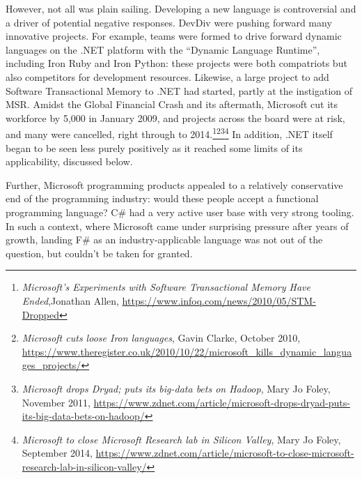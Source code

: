 \documentclass[acmsmall]{acmart}\settopmatter{}
\begin{document}
However, not all was plain sailing.  Developing a new language is controversial and a driver of potential
negative responses. DevDiv were pushing forward many innovative projects. For example, teams
were formed to drive forward dynamic languages on the .NET platform with the “Dynamic Language Runtime”, including
Iron Ruby and Iron Python: these projects were both compatriots but also competitors for development
resources. Likewise, a large project to add Software Transactional Memory to .NET had started, partly
at the instigation of MSR. Amidst the Global Financial Crash and its aftermath, Microsoft cut its workforce
by 5,000 in January 2009, and projects across the board were at risk, and many were cancelled, right
through to 2014.\footnote{\textit{Microsoft’s Experiments with Software Transactional Memory Have Ended},Jonathan Allen, \url{https://www.infoq.com/news/2010/05/STM-Dropped}}\footnote{\textit{Microsoft cuts loose Iron languages}, Gavin Clarke, October 2010, \url{https://www.theregister.co.uk/2010/10/22/microsoft_kills_dynamic_languages_projects/}}\footnote{\textit{Microsoft drops Dryad; puts its big-data bets on Hadoop}, Mary Jo Foley, November 2011,  \url{https://www.zdnet.com/article/microsoft-drops-dryad-puts-its-big-data-bets-on-hadoop/}}\footnote{\textit{Microsoft to close Microsoft Research lab in Silicon Valley}, Mary Jo Foley, September 2014, \url{https://www.zdnet.com/article/microsoft-to-close-microsoft-research-lab-in-silicon-valley/}}
In addition, .NET itself began to be seen less purely positively as it reached some limits of its applicability, discussed below.

Further, Microsoft programming products appealed to a relatively conservative end of the programming industry: would
these people accept a functional programming language? C\# had a very active user base with very strong tooling. In
such a context, where Microsoft came under surprising pressure after years of growth, landing F\# as an industry-applicable
language was not out of the question, but couldn’t be taken for granted.
\end{document}
